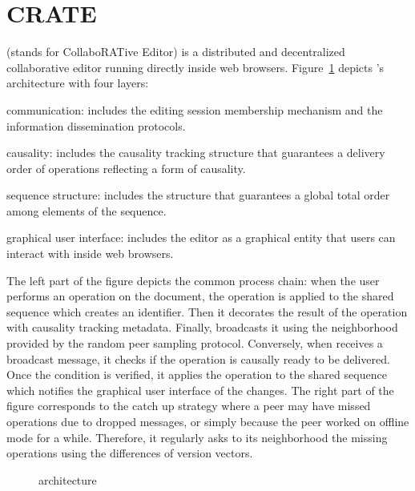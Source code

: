
\section{CRATE}
\label{sec:proposal}

\CRATE (stands for CollaboRATive Editor) is a distributed and decentralized
collaborative editor running directly inside web browsers.
Figure~\ref{fig:architecture} depicts \CRATE's architecture with four layers:
\begin{inparaenum}[(i)]
\item communication: includes the editing session membership mechanism and the
  information dissemination protocols.
\item causality: includes the causality tracking structure that guarantees a
  delivery order of operations reflecting a form of causality.
\item sequence structure: includes the structure that guarantees a global
  total order among elements of the sequence.
\item graphical user interface: includes the editor as a graphical entity that
  users can interact with inside web browsers.
\end{inparaenum}
The left part of the figure depicts the common process chain: when the user
performs an operation on the document, the operation is applied to the shared
sequence which creates an \LSEQ identifier. Then it decorates the result of the
operation with causality tracking metadata. Finally, \CRATE broadcasts it using
the neighborhood provided by the \SPRAY random peer sampling protocol.
Conversely, when \CRATE receives a broadcast message, it checks if the operation
is causally ready to be delivered. Once the condition is verified, it applies
the operation to the shared sequence which notifies the graphical user interface
of the changes.  The right part of the figure corresponds to the catch up
strategy where a peer may have missed operations due to dropped messages, or
simply because the peer worked on offline mode for a while. Therefore, it
regularly asks to its neighborhood the missing operations using the differences
of version vectors.

\begin{figure}
  \centering
  
  \caption{\label{fig:architecture}\CRATE architecture}
\end{figure}



